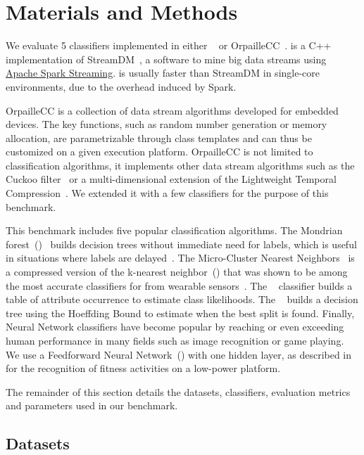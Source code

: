 \section{Materials and Methods}
We evaluate 5 classifiers implemented in either \streamdmcpp~\cite{StreamDM-CPP}
or OrpailleCC~\cite{OrpailleCC}.  \streamdmcpp is a C++ implementation of
StreamDM~\cite{StreamDM}, a software to mine big data streams using
\href{https://spark.apache.org/streaming/}{Apache Spark Streaming}. \streamdmcpp
is usually faster than StreamDM in single-core environments, due to the overhead
induced by Spark.

OrpailleCC is a collection of data stream algorithms developed for embedded
devices. The key functions, such as random number generation or memory
allocation, are parametrizable through class templates and can thus be
customized on a given execution platform.  OrpailleCC is not limited to
classification algorithms, it implements other data stream algorithms such as
the Cuckoo filter~\cite{cuckoo} or a multi-dimensional extension of the
Lightweight Temporal Compression~\cite{multi-ltc}. We extended it with a few
classifiers for the purpose of this benchmark.

This benchmark includes five popular classification algorithms.  The
Mondrian forest~(\mondrianforest)~\cite{mondrian2014} builds decision trees without immediate need
for labels, which is useful in situations where labels are
delayed~\cite{stream_learning_review}.  The Micro-Cluster Nearest
Neighbors~\cite{mc-nn} is a compressed version of the k-nearest neighbor~(\knn)
that was shown to be among the most accurate classifiers for \har from wearable
sensors~\cite{Janidarmian_2017}. The \naivebayes~\cite{naive_bayes} classifier
builds a table of attribute occurrence to estimate class likelihoods.  The
\hoeffdingtree~\cite{VFDT} builds a decision tree using the Hoeffding Bound to
estimate when the best split is found.  Finally, Neural Network classifiers have
become popular by reaching or even exceeding human performance in many fields
such as image recognition or game playing. We use a Feedforward Neural
Network~(\FNN) with one hidden layer,
as described in~\cite{omid_2019} for the recognition of fitness activities on a
low-power platform.

The remainder of this section details the datasets, classifiers, evaluation
metrics and parameters used in our benchmark.

\subsection{Datasets}
\label{sec:method-dataset}

